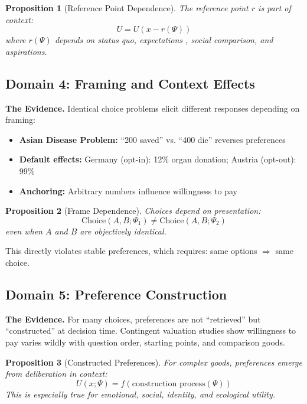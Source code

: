 \documentclass[12pt]{article}
\newtheorem{proposition}{Proposition}
\begin{document}
\begin{proposition}[Reference Point Dependence]
The reference point $r$ is part of context:
\begin{equation}
U = U(x - r(\Psi))
\end{equation}
where $r(\Psi)$ depends on status quo, expectations \citep{koszegirab2006}, social comparison, and aspirations.
\end{proposition}

\subsection{Domain 4: Framing and Context Effects}

\textbf{The Evidence.} Identical choice problems elicit different responses depending on framing:
\begin{itemize}
    \item \textbf{Asian Disease Problem:} ``200 saved'' vs. ``400 die'' reverses preferences \citep{tverskykahneman1981}
    \item \textbf{Default effects:} Germany (opt-in): 12\% organ donation; Austria (opt-out): 99\% \citep{johnsonetal2003}
    \item \textbf{Anchoring:} Arbitrary numbers influence willingness to pay
\end{itemize}

\begin{proposition}[Frame Dependence]
Choices depend on presentation:
\begin{equation}
\text{Choice}(A, B; \Psi_1) \neq \text{Choice}(A, B; \Psi_2)
\end{equation}
even when $A$ and $B$ are objectively identical.
\end{proposition}

This directly violates stable preferences, which requires: same options $\Rightarrow$ same choice.

\subsection{Domain 5: Preference Construction}

\textbf{The Evidence.} For many choices, preferences are not ``retrieved'' but ``constructed'' at decision time. Contingent valuation studies show willingness to pay varies wildly with question order, starting points, and comparison goods.

\begin{proposition}[Constructed Preferences]
For complex goods, preferences emerge from deliberation in context:
\begin{equation}
U(x; \Psi) = f(\text{construction process}(\Psi))
\end{equation}
This is especially true for emotional, social, identity, and ecological utility.
\end{proposition}
\end{document}
